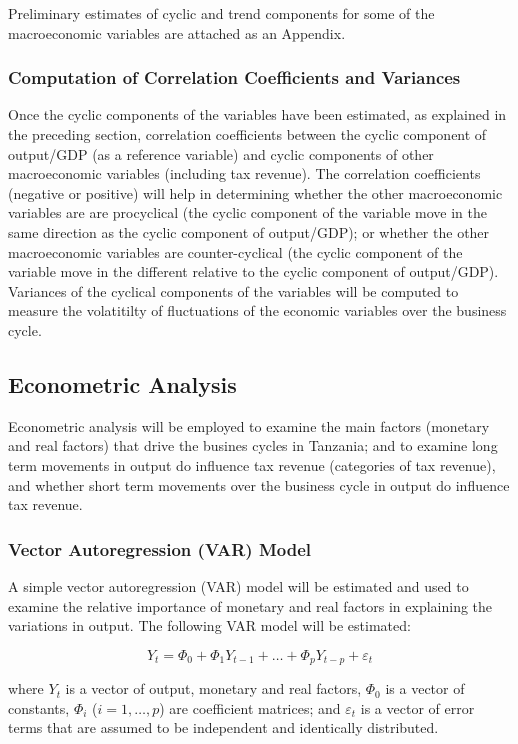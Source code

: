 \documentclass[12pt,a4paper,final]{article}
\begin{document}
Preliminary estimates of cyclic and trend components for some of the macroeconomic variables are attached as an Appendix.

\subsubsection{Computation of Correlation Coefficients and Variances}

Once the cyclic components of the variables have been estimated, as explained in the preceding section, correlation coefficients between the cyclic component of output/GDP (as a reference variable) and cyclic components of other macroeconomic variables (including tax revenue).  The correlation coefficients (negative or positive) will help in determining whether the other macroeconomic variables are are procyclical (the cyclic component of the variable move in the same direction as the cyclic component of output/GDP); or whether the other macroeconomic variables are counter-cyclical (the cyclic component of the variable move in the different relative to the cyclic component of output/GDP). Variances of the cyclical components of the variables will be computed to measure the volatitilty of fluctuations of the economic variables over the business cycle.

\subsection{Econometric Analysis}

Econometric analysis will be employed to examine the main factors (monetary and real factors) that drive the busines cycles in Tanzania; and to examine long term movements in output do influence tax revenue (categories of tax revenue), and whether short term movements over the business cycle in output do influence tax revenue.

\subsubsection{Vector Autoregression (VAR) Model} 

A simple vector autoregression (VAR) model will be estimated and used to examine the relative importance of monetary and real factors in explaining the variations in output. The following VAR model will be estimated:

\[ Y_t = \Phi_0 +\Phi_1 Y_{t-1} + \ldots + \Phi_p Y_{t-p} + \varepsilon_t \]

where $Y_t$ is a vector of output, monetary and real factors, $\Phi_0$ is a vector of constants, $\Phi_i$ ($i=1,\ldots,p$) are coefficient matrices; and $\varepsilon_t$ is a vector of error terms that are assumed to be independent and identically distributed.
\end{document}
